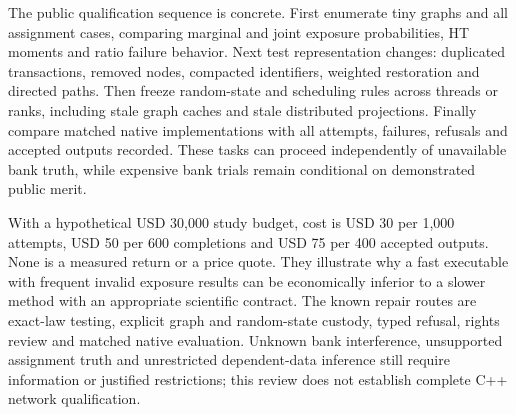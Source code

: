 The public qualification sequence is concrete. First enumerate tiny graphs and all assignment cases, comparing marginal and joint exposure probabilities, HT moments and ratio failure behavior. Next test representation changes: duplicated transactions, removed nodes, compacted identifiers, weighted restoration and directed paths. Then freeze random-state and scheduling rules across threads or ranks, including stale graph caches and stale distributed projections. Finally compare matched native implementations with all attempts, failures, refusals and accepted outputs recorded. These tasks can proceed independently of unavailable bank truth, while expensive bank trials remain conditional on demonstrated public merit.~\citep{exec25_cnet_choice}

With a hypothetical USD 30,000 study budget, cost is USD 30 per 1,000 attempts, USD 50 per 600 completions and USD 75 per 400 accepted outputs. None is a measured return or a price quote. They illustrate why a fast executable with frequent invalid exposure results can be economically inferior to a slower method with an appropriate scientific contract. The known repair routes are exact-law testing, explicit graph and random-state custody, typed refusal, rights review and matched native evaluation. Unknown bank interference, unsupported assignment truth and unrestricted dependent-data inference still require information or justified restrictions; this review does not establish complete C++ network qualification.~\citep{exec25_cnet_choice}
